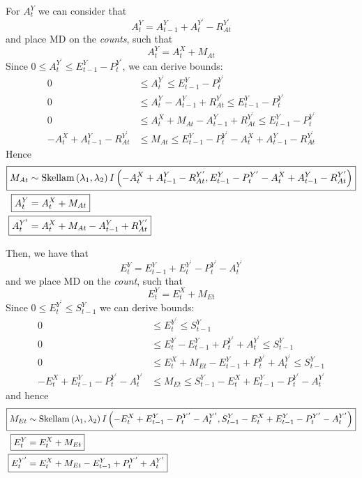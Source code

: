 \documentclass[a4paper]{article}
\begin{document}
For $A^Y_t$ we can consider that
\begin{equation*}
    A^Y_t = A^Y_{t - 1} + A^{Y^\prime}_t - R^{Y^\prime}_{At}
\end{equation*}
and place MD on the \textit{counts}, such that
\begin{equation*}
    A^Y_t = A^X_t + M_{At}
\end{equation*}
Since $0 \leq A^{Y^\prime}_t \leq E^Y_{t - 1} - P^{Y^\prime}_t$, we can derive bounds:
\begin{align*}
    0 &\leq A^{Y^\prime}_t \leq E^Y_{t - 1} - P^{Y^\prime}_t\\
    0 &\leq A^Y_t - A^Y_{t - 1} + R^{Y^\prime}_{At} \leq E^Y_{t - 1} - P^{Y^\prime}_t\\
    0 &\leq A^X_t + M_{At} - A^Y_{t - 1} + R^{Y^\prime}_{At} \leq E^Y_{t - 1} - P^{Y^\prime}_t\\
    -A^X_t + A^Y_{t - 1} - R^{Y^\prime}_{At} &\leq M_{At} \leq E^Y_{t - 1} - P^{Y^\prime}_t - A^X_t + A^Y_{t - 1} - R^{Y^\prime}_{At}
\end{align*}
Hence
\begin{align*}
\Aboxed{M_{At} &\sim \mbox{Skellam}\left(\lambda_1, \lambda_2\right)I\left(-A^X_t + A^Y_{t - 1} - R^{Y^\prime}_{At}, E^Y_{t - 1} - P^{Y^\prime}_t - A^X_t + A^Y_{t - 1} - R^{Y^\prime}_{At}\right)}\\
    \Aboxed{A^Y_t &= A^X_t + M_{At}}\\
    \Aboxed{A^{Y^\prime}_t &= A^X_t + M_{At} - A^Y_{t - 1} + R^{Y^\prime}_{At}}
\end{align*}

Then, we have that
\begin{equation*}
    E^Y_t = E^Y_{t - 1} + E^{Y^\prime}_t - P^{Y^\prime}_t - A^{Y^\prime}_t
\end{equation*}
and we place MD on the \textit{count}, such that
\begin{equation*}
    E^Y_t = E^X_t + M_{Et}
\end{equation*}
Since $0 \leq E^{Y^\prime}_t \leq S^Y_{t - 1}$ we can derive bounds:
\begin{align*}
    0 &\leq E^{Y^\prime}_t \leq S^Y_{t - 1}\\
    0 &\leq E^Y_t - E^Y_{t - 1} + P^{Y^\prime}_t + A^{Y^\prime}_t \leq S^Y_{t - 1}\\
    0 &\leq E^X_t + M_{Et} - E^Y_{t - 1} + P^{Y^\prime}_t + A^{Y^\prime}_t \leq S^Y_{t - 1}\\
    -E^X_t + E^Y_{t - 1} - P^{Y^\prime}_t - A^{Y^\prime}_t &\leq M_{Et} \leq S^Y_{t - 1} - E^X_t + E^Y_{t - 1} - P^{Y^\prime}_t - A^{Y^\prime}_t 
\end{align*}
and hence
\begin{align*}
\Aboxed{M_{Et} &\sim \mbox{Skellam}\left(\lambda_1, \lambda_2\right)I\left(-E^X_t + E^Y_{t - 1} - P^{Y^\prime}_t - A^{Y^\prime}_t, S^Y_{t - 1} - E^X_t + E^Y_{t - 1} - P^{Y^\prime}_t - A^{Y^\prime}_t\right)}\\
    \Aboxed{E^Y_t &= E^X_t + M_{Et}}\\
    \Aboxed{E^{Y^\prime}_t &= E^X_t + M_{Et} - E^Y_{t - 1} + P^{Y^\prime}_t + A^{Y^\prime}_t}
\end{align*}
\end{document}
